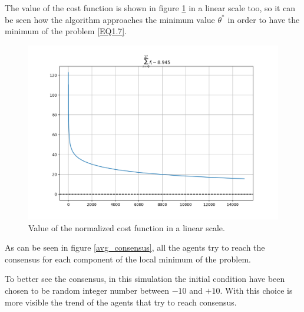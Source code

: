 \documentclass[a4paper,11pt,oneside]{book}
\begin{document}
The value of the cost function is shown in figure \ref{lin_cost} in a linear scale too, so it can be seen how the algorithm approaches the minimum value $\theta^{*}$ in order to have the minimum of the problem \ref{EQ1.7}.

\begin{figure}[ht]
	\centering
	\includegraphics[scale=0.4]{figs/cost_linear_scale}
	\caption{Value of the normalized cost function in a linear scale. }
	\label{lin_cost}
\end{figure}

As can be seen in figure \ref{avg_consensus}, all the agents try to reach the consensus for each component of the local minimum of the problem. 

To better see the consensus, in this simulation the initial condition have been chosen to be random integer number between $-10$ and $+10$. With this choice is more visible the trend of the agents that try to reach consensus.
\end{document}
